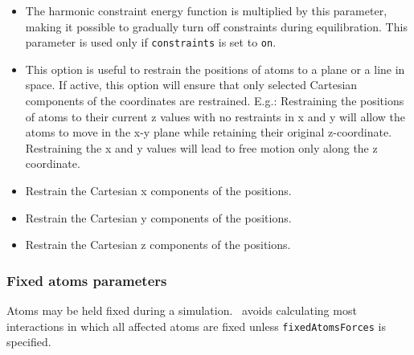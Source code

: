 \begin{itemize}
\item
{}
{The harmonic constraint energy function is multiplied by this parameter,
making it possible to gradually turn off constraints during equilibration.
This parameter is used only if {\tt constraints} is set to 
{\tt on}.}

\item
{}
{This option is useful to restrain the positions of atoms to a plane or a line in space. If active,
 this option will ensure that only selected Cartesian components of the coordinates are restrained.
 E.g.: Restraining the positions of atoms to their current z values with no restraints
 in x and y will allow the atoms to move in the x-y plane while retaining their original z-coordinate.
 Restraining the x and y values will lead to free motion only along the z coordinate.}

\item
{}
{Restrain the Cartesian x components of the positions.}
\item
{}
{Restrain the Cartesian y components of the positions.}
\item
{}
{Restrain the Cartesian z components of the positions.}

\end{itemize}

\subsubsection{Fixed atoms parameters}

Atoms may be held fixed during a simulation.  \NAMD\ avoids calculating most interactions in which all affected atoms are fixed unless {\tt fixedAtomsForces} is specified.

